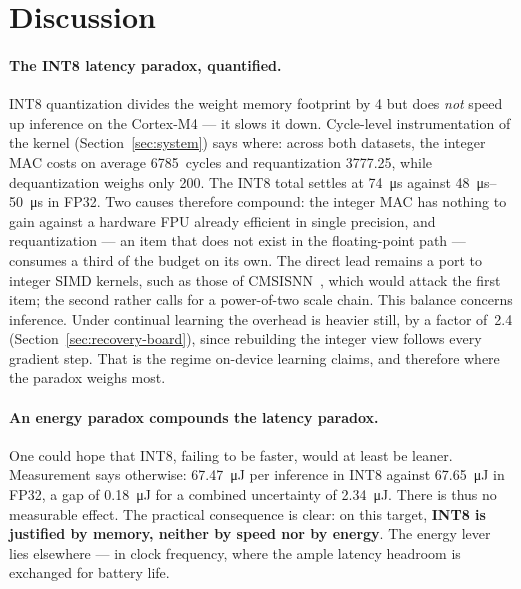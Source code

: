\section{Discussion}
\label{sec:discussion}

\paragraph{The INT8 latency paradox, quantified.} INT8 quantization divides the weight memory footprint by
4 but does \emph{not} speed up inference on the Cortex-M4 --- it slows it down. Cycle-level instrumentation of
the kernel (Section~\ref{sec:system}) says where: across both datasets, the integer MAC costs on average
\num{6785}~cycles and requantization \num{3777.25}, while dequantization weighs only \num{200}. The INT8
total settles at \SI{74}{\micro\second} against \SIrange{48}{50}{\micro\second} in FP32. Two causes therefore
compound: the integer MAC has nothing to gain against a hardware FPU already efficient in single precision,
and requantization --- an item that does not exist in the floating-point path --- consumes a third of the
budget on its own. The direct lead remains a port to integer \gls{SIMD} kernels, such as those of
\gls{CMSISNN}~\cite{Lai2018CMSISNN}, which would attack the
first item; the second rather calls for a power-of-two scale chain.
This balance concerns inference. Under continual learning the overhead is heavier still, by a factor
of~\num{2.4} (Section~\ref{sec:recovery-board}), since rebuilding the integer view follows every gradient
step. That is the regime on-device learning claims, and therefore where the paradox weighs most.

\paragraph{An energy paradox compounds the latency paradox.} One could hope that INT8, failing to be faster,
would at least be leaner. Measurement says otherwise: \SI{67.47}{\micro\joule} per inference in INT8 against
\SI{67.65}{\micro\joule} in FP32, a gap of \SI{0.18}{\micro\joule} for a combined uncertainty of
\SI{2.34}{\micro\joule}. There is thus no measurable effect. The practical consequence is clear: on this
target, \textbf{INT8 is justified by memory, neither by speed nor by energy}. The energy lever lies
elsewhere --- in clock frequency, where the ample latency headroom is exchanged for battery life.

